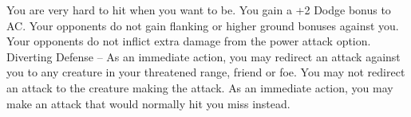 {You are very hard to hit when you want to be.}
{You gain a +2 Dodge bonus to AC.}
{Your opponents do not gain flanking or higher ground bonuses against you.}
{Your opponents do not inflict extra damage from the power attack option.}
{Diverting Defense -- As an immediate action, you may redirect an attack against you to any creature in your threatened range, friend or foe. You may not redirect an attack to the creature making the attack.}
{As an immediate action, you may make an attack that would normally hit you miss instead.}